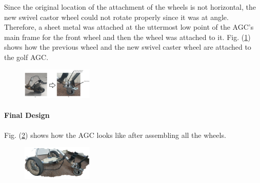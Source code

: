 \documentclass[11pt,landscape]{article}
\begin{document}
\begin{multicols}{3}
Since the original location of the attachment of the wheels is not horizontal,
the new swivel castor wheel could not rotate properly since it was at angle.
Therefore, a sheet metal was attached at the uttermost low point of the AGC's
main frame for the front wheel and then the wheel was attached to it. Fig.
(\ref{fig:new_front_wheels}) shows how the previous wheel and the new swivel
caster wheel are attached to the golf AGC.

\begin{figure}[H]
    \begin{center}
        \includegraphics[width=0.3\textwidth]{New front wheels.PNG}
        \label{fig:new_front_wheels}
    \end{center}
\end{figure}

\paragraph{Final Design}
Fig. (\ref{fig:final_wheels}) shows how the AGC looks like after assembling
all the wheels.

\begin{figure}[H]
    \begin{center}
        \includegraphics[width=0.3\textwidth]{Full wheels.PNG}
        \label{fig:final_wheels}
    \end{center}
\end{figure}



\end{multicols}
\end{document}
